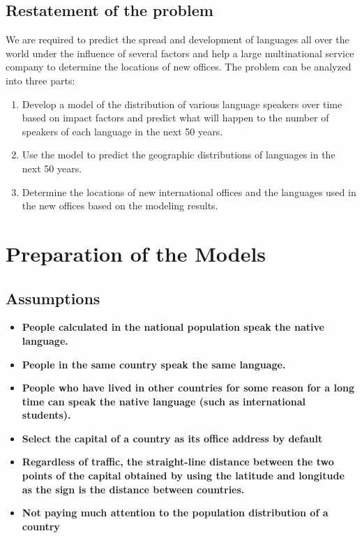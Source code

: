 \documentclass[12pt]{article}  %
\begin{document}
\subsection{Restatement of the problem}
We are required to predict the spread and development of languages all over the world under the influence of several factors and help a large multinational service company to determine the locations of new offices. The problem can be analyzed into three parts:
\begin{enumerate}[\bfseries 1.]
	\item Develop a model of the distribution of various language speakers over time based on impact factors and predict what will happen to the number of speakers of each language in the next 50 years.
	\item 
	Use the model to predict the geographic distributions of languages in the next 50 years.
	\item 
	Determine the locations of new international offices and the languages used in the new offices based on the modeling results.
\end{enumerate}

\section{Preparation of the Models}
\subsection{Assumptions}
\begin{itemize}
	\item \textbf{People calculated in the national population speak the native language.} 
	\item \textbf{People in the same country speak the same language.}
	\item \textbf{People who have lived in other countries for some reason for a long time can speak the native language (such as international students).}
	\item \textbf{Select the capital of a country as its office address by default} 
	\item \textbf{Regardless of traffic, the straight-line distance between the two points of the capital obtained by using the latitude and longitude as the sign is the distance between countries.}
	\item \textbf{Not paying much attention to the population distribution of a country}
\end{itemize}
\end{document}

